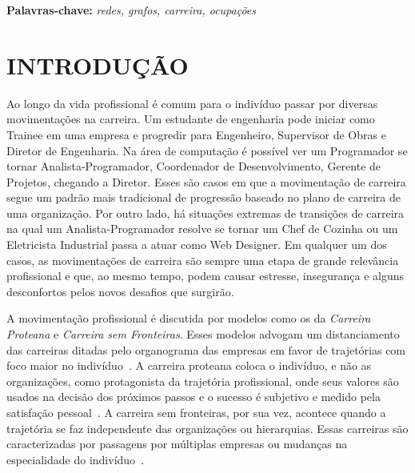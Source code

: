 \documentclass[12pt,a4paper]{article}
\begin{document}
\begin{flushleft}
{\bf Palavras-chave:} \it{redes, grafos, carreira, ocupações}
\end{flushleft}

\newpage
\thispagestyle{empty}
\tableofcontents

\newpage
\pagestyle{plain}
\renewcommand{\baselinestretch}{1.5}
\normalsize

\listoftodos[Notas]

\section{INTRODUÇÃO}

Ao longo da vida profissional é comum para o indivíduo passar por diversas movimentações na carreira. Um estudante de engenharia pode iniciar como Trainee em uma empresa e progredir para Engenheiro, Supervisor de Obras e Diretor de Engenharia. Na área de computação é possível ver um Programador se tornar Analista-Programador, Coordenador de Desenvolvimento, Gerente de Projetos, chegando a Diretor. Esses são casos em que a movimentação de carreira segue um padrão mais tradicional de progressão baseado no plano de carreira de uma organização. Por outro lado, há situações extremas de transições de carreira na qual um Analista-Programador resolve se tornar um Chef de Cozinha ou um Eletricista Industrial passa a atuar como Web Designer. Em qualquer um dos casos, as movimentações de carreira são sempre uma etapa de grande relevância profissional e que, ao mesmo tempo, podem causar estresse, insegurança e alguns desconfortos pelos novos desafios que surgirão.

A movimentação profissional é discutida por modelos como os da \textit{Carreira Proteana} e \textit{Carreira sem Fronteiras}. Esses modelos advogam um distanciamento das carreiras ditadas pelo organograma das empresas em favor de trajetórias com foco maior no indivíduo~\cite{Bendassolli2009-bg}. A carreira proteana coloca o indivíduo, e não as organizações, como protagonista da trajetória profissional, onde seus valores são usados na decisão dos próximos passos e o sucesso é subjetivo e medido pela satisfação pessoal~\cite{Hall2004-ke}. A carreira sem fronteiras, por sua vez, acontece quando a trajetória se faz independente das organizações ou hierarquias. Essas carreiras são caracterizadas por passagens por múltiplas empresas ou mudanças na especialidade do indivíduo~\cite{Arthur1994-qq}.
\end{document}
